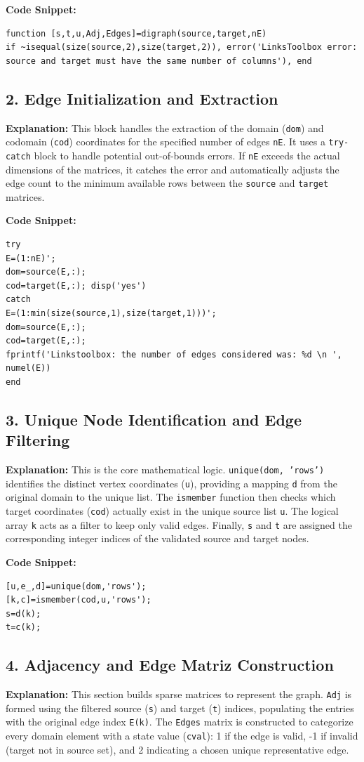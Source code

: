 \textbf{Code Snippet:}
\begin{lstlisting}
function [s,t,u,Adj,Edges]=digraph(source,target,nE)
if ~isequal(size(source,2),size(target,2)), error('LinksToolbox error: source and target must have the same number of columns'), end
\end{lstlisting}

\subsection{2. Edge Initialization and Extraction}
\textbf{Explanation:}
This block handles the extraction of the domain (\texttt{dom}) and codomain (\texttt{cod}) coordinates for the specified number of edges \texttt{nE}. It uses a \texttt{try-catch} block to handle potential out-of-bounds errors. If \texttt{nE} exceeds the actual dimensions of the matrices, it catches the error and automatically adjusts the edge count to the minimum available rows between the \texttt{source} and \texttt{target} matrices.

\textbf{Code Snippet:}
\begin{lstlisting}
try
E=(1:nE)';
dom=source(E,:);
cod=target(E,:); disp('yes')
catch
E=(1:min(size(source,1),size(target,1)))';
dom=source(E,:);
cod=target(E,:);
fprintf('Linkstoolbox: the number of edges considered was: %d \n ', numel(E))
end
\end{lstlisting}

\subsection{3. Unique Node Identification and Edge Filtering}
\textbf{Explanation:}
This is the core mathematical logic. \texttt{unique(dom, 'rows')} identifies the distinct vertex coordinates (\texttt{u}), providing a mapping \texttt{d} from the original domain to the unique list. The \texttt{ismember} function then checks which target coordinates (\texttt{cod}) actually exist in the unique source list \texttt{u}. The logical array \texttt{k} acts as a filter to keep only valid edges. Finally, \texttt{s} and \texttt{t} are assigned the corresponding integer indices of the validated source and target nodes.

\textbf{Code Snippet:}
\begin{lstlisting}
[u,e_,d]=unique(dom,'rows');
[k,c]=ismember(cod,u,'rows');
s=d(k);
t=c(k);
\end{lstlisting}

\subsection{4. Adjacency and Edge Matriz Construction}
\textbf{Explanation:}
This section builds sparse matrices to represent the graph. \texttt{Adj} is formed using the filtered source (\texttt{s}) and target (\texttt{t}) indices, populating the entries with the original edge index \texttt{E(k)}. The \texttt{Edges} matrix is constructed to categorize every domain element with a state value (\texttt{cval}): 1 if the edge is valid, -1 if invalid (target not in source set), and 2 indicating a chosen unique representative edge.

